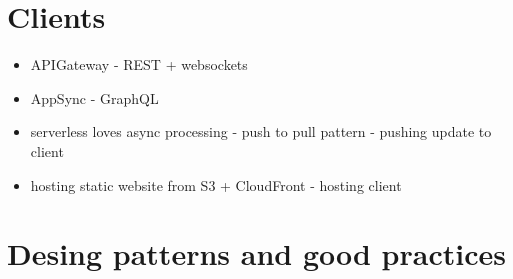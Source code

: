 \section{Clients}

\begin{itemize}
    \item APIGateway - REST + websockets
    \item AppSync - GraphQL
    \item serverless loves async processing - push to pull pattern - pushing update to client
    \item hosting static website from S3 + CloudFront - hosting client
\end{itemize}

\section{Desing patterns and good practices}

